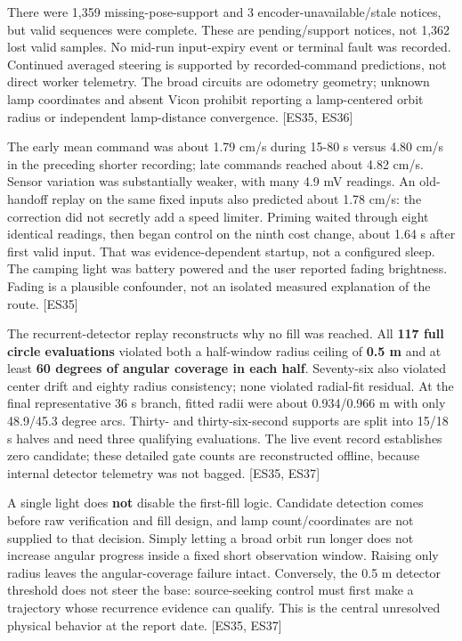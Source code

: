 \documentclass[
  10pt,
  letterpaper,
]{article}
\newcounter{none} %
\begin{document}
There were 1,359 missing-pose-support and 3 encoder-unavailable/stale
notices, but valid sequences were complete. These are pending/support
notices, not 1,362 lost valid samples. No mid-run input-expiry event or
terminal fault was recorded. Continued averaged steering is supported by
recorded-command predictions, not direct worker telemetry. The broad
circuits are odometry geometry; unknown lamp coordinates and absent
Vicon prohibit reporting a lamp-centered orbit radius or independent
lamp-distance convergence. {[}ES35, ES36{]}

The early mean command was about 1.79 cm/s during 15-80 s versus 4.80
cm/s in the preceding shorter recording; late commands reached about
4.82 cm/s. Sensor variation was substantially weaker, with many 4.9 mV
readings. An old-handoff replay on the same fixed inputs also predicted
about 1.78 cm/s: the correction did not secretly add a speed limiter.
Priming waited through eight identical readings, then began control on
the ninth cost change, about 1.64 s after first valid input. That was
evidence-dependent startup, not a configured sleep. The camping light
was battery powered and the user reported fading brightness. Fading is a
plausible confounder, not an isolated measured explanation of the route.
{[}ES35{]}

The recurrent-detector replay reconstructs why no fill was reached. All
\textbf{117 full circle evaluations} violated both a half-window radius
ceiling of \textbf{0.5 m} and at least \textbf{60 degrees of angular
coverage in each half}. Seventy-six also violated center drift and
eighty radius consistency; none violated radial-fit residual. At the
final representative 36 s branch, fitted radii were about 0.934/0.966 m
with only 48.9/45.3 degree arcs. Thirty- and thirty-six-second supports
are split into 15/18 s halves and need three qualifying evaluations. The
live event record establishes zero candidate; these detailed gate counts
are reconstructed offline, because internal detector telemetry was not
bagged. {[}ES35, ES37{]}

A single light does \textbf{not} disable the first-fill logic. Candidate
detection comes before raw verification and fill design, and lamp
count/coordinates are not supplied to that decision. Simply letting a
broad orbit run longer does not increase angular progress inside a fixed
short observation window. Raising only radius leaves the
angular-coverage failure intact. Conversely, the 0.5 m detector
threshold does not steer the base: source-seeking control must first
make a trajectory whose recurrence evidence can qualify. This is the
central unresolved physical behavior at the report date. {[}ES35,
ES37{]}
\end{document}
